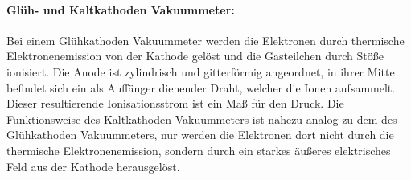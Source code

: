 \paragraph{Glüh- und Kaltkathoden Vakuummeter:}
Bei einem Glühkathoden Vakuummeter werden die Elektronen durch thermische Elektronenemission von der Kathode gelöst und die Gasteilchen durch Stöße ionisiert. Die
Anode ist zylindrisch und gitterförmig angeordnet, in ihrer Mitte befindet sich ein als Auffänger dienender Draht, welcher die Ionen aufsammelt. Dieser resultierende
Ionisationsstrom ist ein Maß für den Druck.
Die Funktionsweise des Kaltkathoden Vakuummeters ist nahezu analog zu dem des Glühkathoden Vakuummeters, nur werden die Elektronen dort nicht durch die thermische Elektronenemission,
sondern durch ein starkes äußeres elektrisches Feld aus der Kathode herausgelöst.

